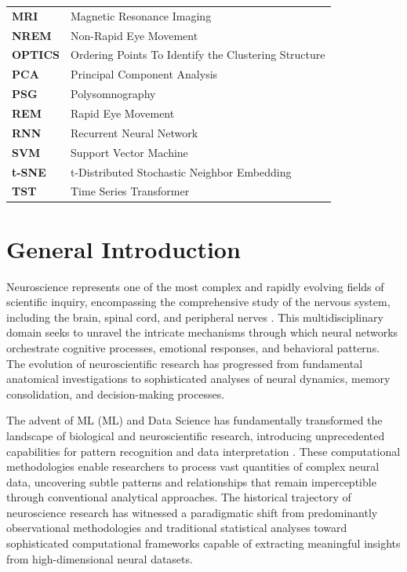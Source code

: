 \documentclass[a4paper,12pt,twoside]{article}
\begin{document}
\begin{tabular}{ll}
\textbf{MRI} & Magnetic Resonance Imaging \\
\textbf{NREM} & Non-Rapid Eye Movement \\
\textbf{OPTICS} & Ordering Points To Identify the Clustering Structure \\
\textbf{PCA} & Principal Component Analysis \\
\textbf{PSG} & Polysomnography \\
\textbf{REM} & Rapid Eye Movement \\
\textbf{RNN} & Recurrent Neural Network \\
\textbf{SVM} & Support Vector Machine \\
\textbf{t-SNE} & t-Distributed Stochastic Neighbor Embedding \\
\textbf{TST} & Time Series Transformer \\
\end{tabular}

\clearpage

\tableofcontents
\clearpage
\listoffigures
\clearpage
\listoftables

\clearpage



\section*{General Introduction}

\onehalfspacing %

Neuroscience represents one of the most complex and rapidly evolving fields of scientific inquiry, encompassing the comprehensive study of the nervous system, including the brain, spinal cord, and peripheral nerves \cite{niedermeyer2004electroencephalography}. This multidisciplinary domain seeks to unravel the intricate mechanisms through which neural networks orchestrate cognitive processes, emotional responses, and behavioral patterns. The evolution of neuroscientific research has progressed from fundamental anatomical investigations to sophisticated analyses of neural dynamics, memory consolidation, and decision-making processes.

The advent of ML (ML) and Data Science has fundamentally transformed the landscape of biological and neuroscientific research, introducing unprecedented capabilities for pattern recognition and data interpretation \cite{supratak2017deepsleepnet}. These computational methodologies enable researchers to process vast quantities of complex neural data, uncovering subtle patterns and relationships that remain imperceptible through conventional analytical approaches. The historical trajectory of neuroscience research has witnessed a paradigmatic shift from predominantly observational methodologies and traditional statistical analyses toward sophisticated computational frameworks capable of extracting meaningful insights from high-dimensional neural datasets.
\end{document}
